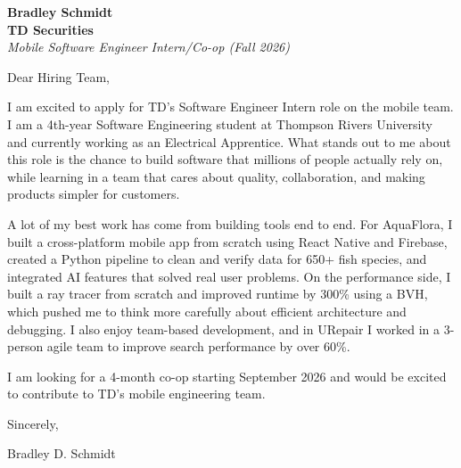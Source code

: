 \documentclass[11pt]{article}
\begin{document}
\textbf{Bradley Schmidt}\\
\vspace{0.5em}
\textbf{TD Securities}\\
\textit{Mobile Software Engineer Intern/Co-op (Fall 2026)}

Dear Hiring Team,

\par

I am excited to apply for TD’s Software Engineer Intern role on the mobile team. I am a 4th-year Software Engineering student at Thompson Rivers University and currently working as an Electrical Apprentice. What stands out to me about this role is the chance to build software that millions of people actually rely on, while learning in a team that cares about quality, collaboration, and making products simpler for customers.

\par

A lot of my best work has come from building tools end to end. For AquaFlora, I built a cross-platform mobile app from scratch using React Native and Firebase, created a Python pipeline to clean and verify data for 650+ fish species, and integrated AI features that solved real user problems. On the performance side, I built a ray tracer from scratch and improved runtime by 300\% using a BVH, which pushed me to think more carefully about efficient architecture and debugging. I also enjoy team-based development, and in URepair I worked in a 3-person agile team to improve search performance by over 60\%.

\par

I am looking for a 4-month co-op starting September 2026 and would be excited to contribute to TD’s mobile engineering team.

\par

Sincerely,

\par

Bradley D. Schmidt
\end{document}
